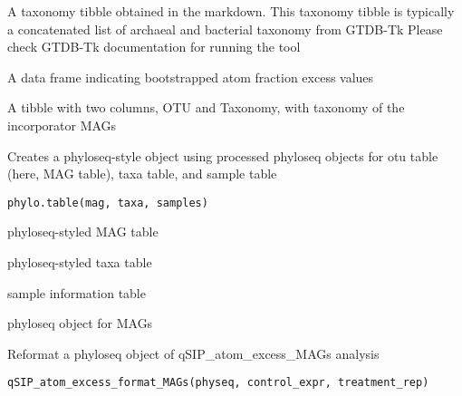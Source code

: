 \documentclass[a4paper]{book}
\begin{document}
%
\begin{Arguments}
\begin{ldescription}
\item[\code{taxonomy}] A taxonomy tibble obtained in the markdown. This taxonomy tibble is
typically a concatenated list of archaeal and bacterial taxonomy from GTDB-Tk
Please check GTDB-Tk documentation for running the tool

\item[\code{bootstrapped\_AFE\_table}] A data frame indicating bootstrapped atom fraction excess values
\end{ldescription}
\end{Arguments}
%
\begin{Value}
A tibble with two columns, OTU and Taxonomy, with taxonomy of the incorporator MAGs
\end{Value}
%
\begin{Description}\relax
Creates a phyloseq-style object using processed phyloseq objects for otu
table (here, MAG table), taxa table, and sample table
\end{Description}
%
\begin{Usage}
\begin{verbatim}
phylo.table(mag, taxa, samples)
\end{verbatim}
\end{Usage}
%
\begin{Arguments}
\begin{ldescription}
\item[\code{mag}] phyloseq-styled MAG table

\item[\code{taxa}] phyloseq-styled taxa table

\item[\code{samples}] sample information table
\end{ldescription}
\end{Arguments}
%
\begin{Value}
phyloseq object for MAGs
\end{Value}
%
\begin{Description}\relax
Reformat a phyloseq object of qSIP\_atom\_excess\_MAGs analysis
\end{Description}
%
\begin{Usage}
\begin{verbatim}
qSIP_atom_excess_format_MAGs(physeq, control_expr, treatment_rep)
\end{verbatim}
\end{Usage}
\end{document}
